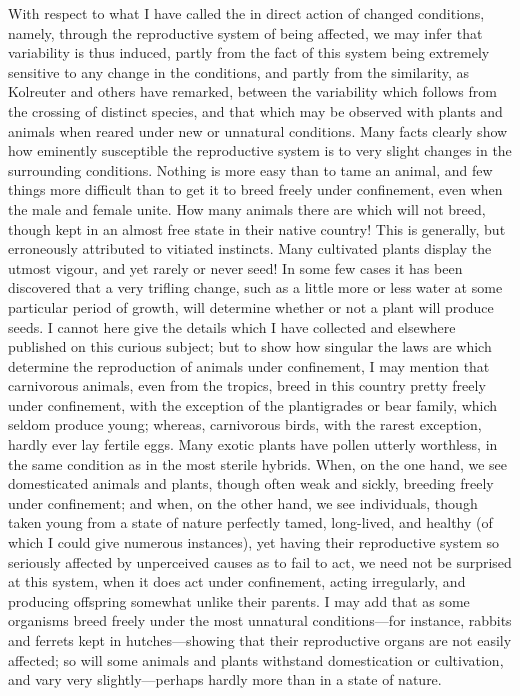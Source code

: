 With respect to what I have called the in direct action of
changed conditions, namely, through the reproductive system of
being affected, we may infer that variability is thus induced,
partly from the fact of this system being extremely sensitive to
any change in the conditions, and partly from the similarity, as
Kolreuter and others have remarked, between the variability which
follows from the crossing of distinct species, and that which may
be observed with plants and animals when reared under new or
unnatural conditions. Many facts clearly show how eminently
susceptible the reproductive system is to very slight changes in
the surrounding conditions. Nothing is more easy than to tame an
animal, and few things more difficult than to get it to breed
freely under confinement, even when the male and female unite. How
many animals there are which will not breed, though kept in an
almost free state in their native country! This is generally, but
erroneously attributed to vitiated instincts. Many cultivated
plants display the utmost vigour, and yet rarely or never seed! In
some few cases it has been discovered that a very trifling change,
such as a little more or less water at some particular period of
growth, will determine whether or not a plant will produce seeds. I
cannot here give the details which I have collected and elsewhere
published on this curious subject; but to show how singular the
laws are which determine the reproduction of animals under
confinement, I may mention that carnivorous animals, even from the
tropics, breed in this country pretty freely under confinement,
with the exception of the plantigrades or bear family, which seldom
produce young; whereas, carnivorous birds, with the rarest
exception, hardly ever lay fertile eggs. Many exotic plants have
pollen utterly worthless, in the same condition as in the most
sterile hybrids. When, on the one hand, we see domesticated animals
and plants, though often weak and sickly, breeding freely under
confinement; and when, on the other hand, we see individuals,
though taken young from a state of nature perfectly tamed,
long-lived, and healthy (of which I could give numerous instances),
yet having their reproductive system so seriously affected by
unperceived causes as to fail to act, we need not be surprised at
this system, when it does act under confinement, acting
irregularly, and producing offspring somewhat unlike their parents.
I may add that as some organisms breed freely under the most
unnatural conditions—for instance, rabbits and ferrets kept in
hutches—showing that their reproductive organs are not easily
affected; so will some animals and plants withstand domestication
or cultivation, and vary very slightly—perhaps hardly more than in
a state of nature.

